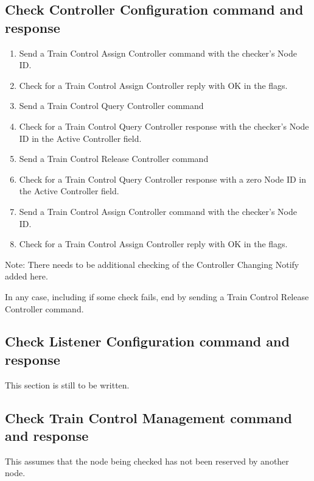 \subsection{Check Controller Configuration command and response}

\begin{enumerate}

    \item Send a Train Control Assign Controller command with the checker's Node ID.
    \item Check for a Train Control Assign Controller reply with OK in the flags.

    \item Send a Train Control Query Controller command
    \item Check for a Train Control Query Controller response with the checker's Node ID
        in the Active Controller field.

    \item Send a Train Control Release Controller command
    \item Check for a Train Control Query Controller response with a zero Node ID
        in the Active Controller field.
    
    \item Send a Train Control Assign Controller command with the checker's Node ID.
    \item Check for a Train Control Assign Controller reply with OK in the flags.

\end{enumerate}

Note:  There needs to be additional checking of the Controller Changing Notify 
    added here.

In any case, including if some check fails, end by sending a Train Control Release
    Controller command.

\subsection{Check Listener Configuration command and response}

This section is still to be written.

\subsection{Check Train Control Management command and response}

This assumes that the node being checked has not been reserved by another node.

